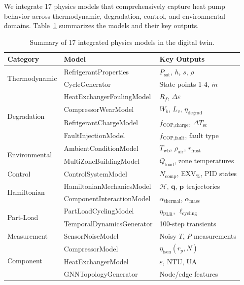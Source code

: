 \documentclass[11pt]{article}
\begin{document}
We integrate 17 physics models that comprehensively capture heat pump behavior across thermodynamic, degradation, control, and environmental domains. Table~\ref{tab:physics_models} summarizes the models and their key outputs.

\begin{table}[h]
\caption{Summary of 17 integrated physics models in the digital twin.}
\label{tab:physics_models}
\centering
\small
\begin{tabular}{@{}llp{5cm}@{}}
\toprule
\textbf{Category} & \textbf{Model} & \textbf{Key Outputs} \\
\midrule
\multirow{2}{*}{Thermodynamic} & RefrigerantProperties & $P_{\text{sat}}$, $h$, $s$, $\rho$ \\
& CycleGenerator & State points 1-4, $\dot{m}$ \\
\midrule
\multirow{4}{*}{Degradation} & HeatExchangerFoulingModel & $R_f$, $\Delta\varepsilon$ \\
& CompressorWearModel & $W_b$, $L_v$, $\eta_{\text{degrad}}$ \\
& RefrigerantChargeModel & $f_{\text{COP,charge}}$, $\Delta T_{\text{sc}}$ \\
& FaultInjectionModel & $f_{\text{COP,fault}}$, fault type \\
\midrule
\multirow{2}{*}{Environmental} & AmbientConditionModel & $T_{\text{wb}}$, $\rho_{\text{air}}$, $r_{\text{frost}}$ \\
& MultiZoneBuildingModel & $Q_{\text{load}}$, zone temperatures \\
\midrule
Control & ControlSystemModel & $N_{\text{comp}}$, EXV$_{\%}$, PID states \\
\midrule
\multirow{2}{*}{Hamiltonian} & HamiltonianMechanicsModel & $\mathcal{H}$, $\mathbf{q}$, $\mathbf{p}$ trajectories \\
& ComponentInteractionModel & $\alpha_{\text{thermal}}$, $\alpha_{\text{mass}}$ \\
\midrule
\multirow{2}{*}{Part-Load} & PartLoadCyclingModel & $\eta_{\text{PLR}}$, $\ell_{\text{cycling}}$ \\
& TemporalDynamicsGenerator & 100-step transients \\
\midrule
Measurement & SensorNoiseModel & Noisy $T$, $P$ measurements \\
\midrule
\multirow{3}{*}{Component} & CompressorModel & $\eta_{\text{isen}}(r_p, N)$ \\
& HeatExchangerModel & $\varepsilon$, NTU, UA \\
& GNNTopologyGenerator & Node/edge features \\
\bottomrule
\end{tabular}
\end{table}
\end{document}
